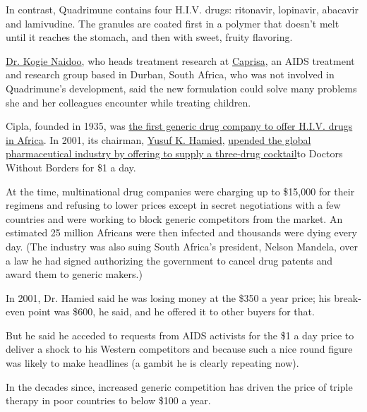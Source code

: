 In contrast, Quadrimune contains four H.I.V. drugs: ritonavir,
lopinavir, abacavir and lamivudine. The granules are coated first in a
polymer that doesn't melt until it reaches the stomach, and then with
sweet, fruity flavoring.

\href{https://www.fic.nih.gov/News/Examples/Pages/ImprovingHIVAIDS.aspx}{Dr.
Kogie Naidoo}, who heads treatment research at
\href{https://www.caprisa.org/}{Caprisa}, an AIDS treatment and research
group based in Durban, South Africa, who was not involved in
Quadrimune's development, said the new formulation could solve many
problems she and her colleagues encounter while treating children.

Cipla, founded in 1935, was
\href{https://www.amfar.org/articles/around-the-world/treatasia/older/an-interview-with-cipla-s-yusuf-hamied\%E2\%80\%94indian-drug-maker-leads-the-charge-for-low-cost-aids-drugs/}{the
first generic drug company to offer H.I.V. drugs in Africa}. In 2001,
its chairman,
\href{https://www.hbs.edu/creating-emerging-markets/interviews/Pages/profile.aspx?profile=yhamied}{Yusuf
K. Hamied},
\href{https://www.nytimes3xbfgragh.onion/2001/02/07/world/indian-company-offers-to-supply-aids-drugs-at-low-cost-in-africa.html}{upended
the global pharmaceutical industry by offering to supply a three-drug
cocktail}to Doctors Without Borders for \$1 a day.

At the time, multinational drug companies were charging up to \$15,000
for their regimens and refusing to lower prices except in secret
negotiations with a few countries and were working to block generic
competitors from the market. An estimated 25 million Africans were then
infected and thousands were dying every day. (The industry was also
suing South Africa's president, Nelson Mandela, over a law he had signed
authorizing the government to cancel drug patents and award them to
generic makers.)

In 2001, Dr. Hamied said he was losing money at the \$350 a year price;
his break-even point was \$600, he said, and he offered it to other
buyers for that.

But he said he acceded to requests from AIDS activists for the \$1 a day
price to deliver a shock to his Western competitors and because such a
nice round figure was likely to make headlines (a gambit he is clearly
repeating now).

In the decades since, increased generic competition has driven the price
of triple therapy in poor countries to below \$100 a year.

